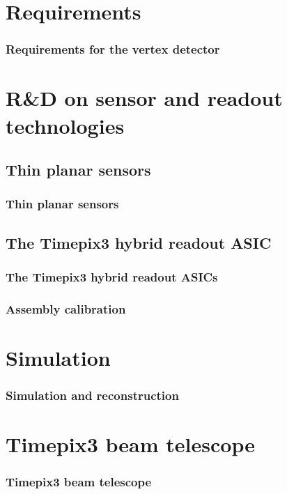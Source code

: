 \section{Requirements}
\begin{frame}
  \frametitle{Requirements for the vertex detector}
\end{frame}


\section{R\&D on sensor and readout technologies}
\subsection{Thin planar sensors}
\begin{frame}
  \frametitle{Thin planar sensors}
\end{frame}
\subsection{The Timepix3 hybrid readout ASIC}
\begin{frame}
  \frametitle{The Timepix3 hybrid readout ASICs}
\end{frame}
\begin{frame}
  \frametitle{Assembly calibration}
\end{frame}

\section{Simulation}
\begin{frame}
  \frametitle{Simulation and reconstruction}
\end{frame}


\section{Timepix3 beam telescope}
\begin{frame}
  \frametitle{Timepix3 beam telescope}
\end{frame}

